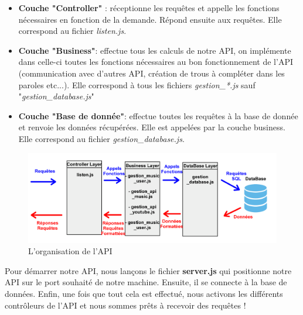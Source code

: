 \documentclass[12pt,french]{article}
\begin{document}
\begin{itemize}
	\item \textbf{Couche "Controller"} : réceptionne les requêtes et appelle les fonctions nécessaires en fonction de la demande. Répond ensuite aux requêtes. Elle correspond au fichier \textit{listen.js}.
	\item \textbf{Couche "Business"}: effectue tous les calculs de notre \gls{API}, on implémente dans celle-ci toutes les fonctions nécessaires au bon fonctionnement de l'\gls{API} (communication avec d'autres \gls{API}, création de trous à compléter dans les paroles etc...). Elle correspond à tous les fichiers \textit{gestion\_*.js} sauf "\textit{gestion\_database.js}"
	\item \textbf{Couche "Base de donnée"}: effectue toutes les requêtes à la base de donnée et renvoie les données récupérées. Elle est appelées par la couche business. Elle correspond au fichier \textit{gestion\_database.js}.
	
\end{itemize}

\bigskip

\begin{figure}[H]
	\centering
	\includegraphics[scale=0.1]{api_couche.png}
	\caption{
	L'organisation de l'API}    
\end{figure}

\bigskip

Pour démarrer notre \gls{API}, nous lançons le fichier \textbf{server.js} qui positionne notre \gls{API} sur le port souhaité de notre machine. Ensuite, il se connecte à la base de données. Enfin, une fois que tout cela est effectué, nous activons les différents contrôleurs de l'\gls{API} et nous sommes prêts à recevoir des requêtes !
\end{document}
